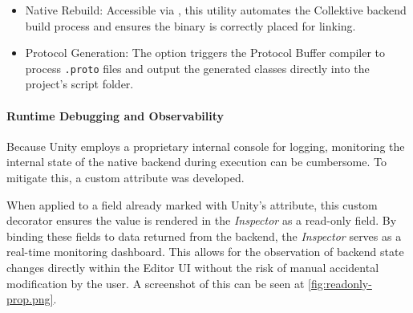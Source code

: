 \begin{itemize}
\item Native Rebuild: Accessible via , this utility automates the Collektive backend build process and ensures the binary is correctly placed for linking.
\item Protocol Generation: The  option triggers the Protocol Buffer compiler to process \texttt{.proto} files and output the generated classes directly into the project's script folder.
\end{itemize}

\paragraph{Runtime Debugging and Observability}
Because Unity employs a proprietary internal console for logging, monitoring the internal state of the native backend during execution can be cumbersome. To mitigate this, a custom  attribute was developed.

When applied to a field already marked with Unity's  attribute, this custom decorator ensures the value is rendered in the \textit{Inspector} as a read-only field. By binding these fields to data returned from the backend, the \textit{Inspector} serves as a real-time monitoring dashboard. This allows for the observation of backend state changes directly within the Editor UI without the risk of manual accidental modification by the user. A screenshot of this can be seen at \cref{fig:readonly-prop.png}.

